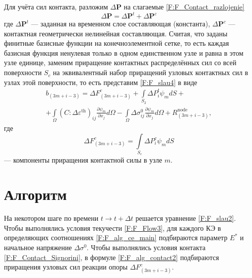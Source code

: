 Для учёта сил контакта, разложим $\Delta\mathbf{P}$ на слагаемые \eqref{F:F_Contact_razlojenie}
\begin{equation}
\Delta\mathbf{P}=\Delta\mathbf{P}^{t}+\Delta\mathbf{P}^{c}
\label{F:F_alg_contact1}
\end{equation}
где $\Delta\mathbf{P}^{t}$ --- заданная на временном слое составляющая (константа), $\Delta \mathbf{P}^{c}$ --- контактная геометрически нелинейная составляющая. Считая, что заданы финитные базисные функции на конечноэлементной сетке, то есть каждая базисная функция ненулевая только в одном единственном узле и равна в этом узле единице, заменим приращение контактных распределённых сил со всей поверхности $S_c$ на эквивалентный набор приращений узловых контактных сил в узлах этой поверхности, то есть представим \eqref{F:F_slau4} в виде
\begin{equation}
\begin{gathered}
b_{(3m+i-3)}=
\Delta F_{(3m+i-3)}^{c}
+\int\limits_{S_{2}}\Delta P_{i}^{t}\psi_{m} dS+\\
+\int\limits_{\Omega}\left(C:\Delta\varepsilon^{\mathrm{th}}\right)_{ij}\frac{\partial\psi_{m}}{\partial x_j}d\Omega
-\int\limits_{\Omega}\Delta\sigma_{ij}^{0}\frac{\partial\psi_{m}}{\partial x_j}d\Omega+R_{(3m+i-3)}^{\mathrm{node}},
\end{gathered}
\label{F:F_alg_contact2}
\end{equation}
где
\begin{equation}
\Delta F_{(3m+i-3)}^{c}=\int\limits_{S_{c}}\Delta P_{i}^{c}\psi_{m} dS
\label{F:F_alg_contact3}
\end{equation}
--- компоненты приращения контактной силы в узле $m$.

\section{Алгоритм}
На некотором шаге по времени $t\longrightarrow t+\Delta t$ решается уравнение \eqref{F:F_slau2}. Чтобы выполнялись условия текучести \eqref{F:F_Flow3}, для каждого КЭ в определяющих соотношениях \eqref{F:F_alg_ce_main} подбираются параметр $E^*$ и начальное напряжение $\Delta\sigma^{0}$. Чтобы выполнялись условия контакта \eqref{F:F_Contact_Signorini}, в формуле \eqref{F:F_alg_contact2} подбираются приращения узловых сил реакции опоры $\Delta F_{(3m+i-3)}^{c}$.

